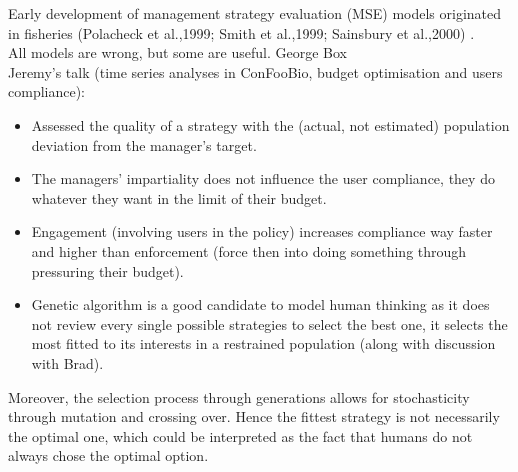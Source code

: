 \documentclass[12pt]{article}
\begin{document}
Early  development  of  management  strategy  evaluation  (MSE)  models  originated  in  fisheries (Polacheck  et  al.,1999; Smith  et  al.,1999; Sainsbury  et  al.,2000) \citep{duthie2018}.\\

All models are wrong, but some are useful. George Box\\

Jeremy's talk (time series analyses in ConFooBio, budget optimisation and users compliance):
\begin{itemize}
    \item Assessed the quality of a strategy with the (actual, not estimated) population deviation from the manager's target.
    \item The managers' impartiality does not influence the user compliance, they do whatever they want in the limit of their budget.
    \item Engagement (involving users in the policy) increases compliance way faster and higher than enforcement (force then into doing something through pressuring their budget).
    \item  Genetic algorithm is a good candidate to model human thinking as it does not review every single possible strategies to select the best one, it selects the most fitted to its interests in a restrained population (along with discussion with Brad).
\end{itemize}
Moreover, the selection process through generations allows for stochasticity through mutation and crossing over. Hence the fittest strategy is not necessarily the optimal one, which could be interpreted as the fact that humans do not always chose the optimal option. 
\end{document}
